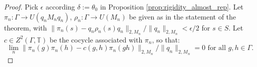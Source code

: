 \documentclass[10pt,a4paper]{amsart}
\newcommand{\C}{{\mathbb{C}}}
\newcommand{\T}{{\mathbb{T}}}
\begin{document}
    \begin{proof}
        Pick $\epsilon$ according $\delta := \theta_0$ in Proposition \ref{prop:rigidity_almost_rep}. 
        Let $\pi_n:\Gamma \to U(q_nM_nq_n)$, $\rho_n: \Gamma \to U(M_n)$ be given as in the statement of the theorem, with $\| \pi_n(s) - q_n\rho_n(s) q_n\|_{2,M_n} / \|q_n \|_{2,M_n}< \epsilon / 2$ for $s \in S$. Let $c\in Z^2(\Gamma, \T)$ be the cocycle associated with $\pi_n$, so that:
    $$\lim_n \| \pi_n(g)\pi_n(h) - c(g,h) \pi_n(gh)\|_{2,M_n} / \| q_n \|_{2,M_n} = 0 \text{ for all $g,h \in \Gamma$.}$$
    

\end{proof}
\end{document}

